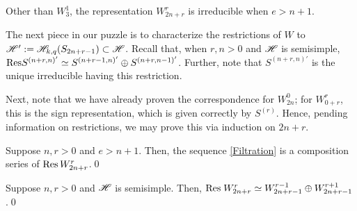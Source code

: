 \documentclass{amsart}
\begin{document}
\begin{corollary}
  Other than $W_{3}^1$, the representation $W_{2n + r}^r$ is irreducible when $e > n + 1$.
\end{corollary}

The next piece in our puzzle is to characterize the restrictions of $W$ to $\mathscr{H}' := \mathscr{H}_{k,q}(S_{2n + r - 1}) \subset \mathscr{H}$.
Recall that, when $r,n>0$ and $\mathscr{H}$ is semisimple,  $\text{Res} S^{(n+r,n)'} \simeq S^{(n+r-1,n)'} \oplus S^{(n+r,n-1)'}$.
Further, note that $S^{(n+r,n)'}$ is the unique irreducible having this restriction.

Next, note that we have already proven the correspondence for $W_{2n}^0$;
for $W_{0 + r}^{r}$, this is the sign representation, which is given correctly by $S^{(r)}$.
Hence, pending information on restrictions, we may prove this via induction on $2n + r$.


\begin{corollary}
  Suppose $n,r > 0$ and $e > n + 1$.
  Then, the sequence \eqref{Filtration} is a composition series of $\text{Res} \, W_{2n + r}^r$.\qed
\end{corollary}
\begin{corollary}
  Suppose $n,r > 0$ and $\mathscr{H}$ is semisimple.
  Then, $\text{Res} \; W_{2n + r}^r \simeq W_{2n + r - 1}^{r - 1} \oplus W_{2n + r - 1}^{r +1}$.\qed
\end{corollary}
\end{document}
